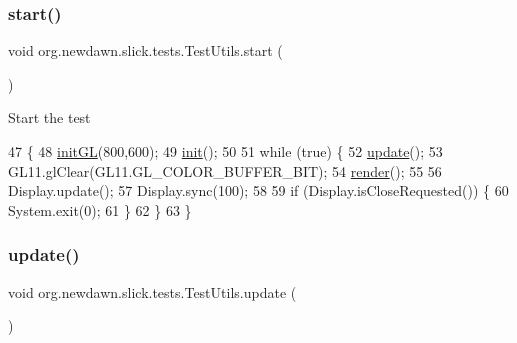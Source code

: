\subsubsection{\texorpdfstring{start()}{start()}}
{\footnotesize\ttfamily void org.\+newdawn.\+slick.\+tests.\+Test\+Utils.\+start (\begin{DoxyParamCaption}{ }\end{DoxyParamCaption})\hspace{0.3cm}{\ttfamily [inline]}}

Start the test 
\begin{DoxyCode}
47                         \{
48         \mbox{\hyperlink{classorg_1_1newdawn_1_1slick_1_1tests_1_1_test_utils_aa258422cf2a025183e44eb3a13b66e3f}{initGL}}(800,600);
49         \mbox{\hyperlink{classorg_1_1newdawn_1_1slick_1_1tests_1_1_test_utils_ac7ed064f8a58185047e1ef6870382747}{init}}();
50         
51         \textcolor{keywordflow}{while} (\textcolor{keyword}{true}) \{
52             \mbox{\hyperlink{classorg_1_1newdawn_1_1slick_1_1tests_1_1_test_utils_a109c078a4703d9f559df11450b3e6754}{update}}();
53             GL11.glClear(GL11.GL\_COLOR\_BUFFER\_BIT);
54             \mbox{\hyperlink{classorg_1_1newdawn_1_1slick_1_1tests_1_1_test_utils_ad588dc36052b23fc284e1f9cc3baf498}{render}}();
55             
56             Display.update();
57             Display.sync(100);
58 
59             \textcolor{keywordflow}{if} (Display.isCloseRequested()) \{
60                 System.exit(0);
61             \}
62         \}
63     \}
\end{DoxyCode}
\mbox{\label{classorg_1_1newdawn_1_1slick_1_1tests_1_1_test_utils_a109c078a4703d9f559df11450b3e6754}} 
\subsubsection{\texorpdfstring{update()}{update()}}
{\footnotesize\ttfamily void org.\+newdawn.\+slick.\+tests.\+Test\+Utils.\+update (\begin{DoxyParamCaption}{ }\end{DoxyParamCaption})\hspace{0.3cm}{\ttfamily [inline]}}

